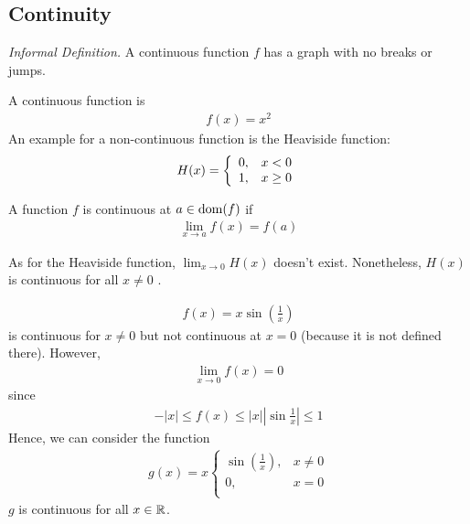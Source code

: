 






\subsection{Continuity}
\emph{Informal Definition.} A continuous function $f$ has a graph with no breaks or jumps.
\begin{ex} A continuous function is
\begin{align*}
f(x) = x^2
\end{align*}
An example for a non-continuous function is the Heaviside function:
\begin{align*}
H(x) = \left\{
\begin{array}{l l}
0, & x<0\\
1, & x\ge 0
\end{array}\right.
\end{align*} 
\end{ex}
\begin{df}
A function $f$ is continuous at $a \in \operatorname{dom}(f)$ if 
\begin{align*}
\lim_{x\to a} f(x) = f(a)
\end{align*}
\end{df}
As for the Heaviside function, $\lim_{x\to 0} H(x)$ doesn't exist. Nonetheless, $H(x)$ is continuous for all $x \neq 0$ .

\begin{ex}
\begin{align*}
f(x) = x \sin \left( \frac 1 x \right)
\end{align*}
is continuous for $x \neq 0$ but not continuous at $x=0$ (because it is not defined there). However,
\begin{align*}
\lim_{x\to 0} f(x) = 0
\end{align*}
since 
\begin{align*}
-|x| \leq f(x) \leq |x|
\left| \sin \frac  1 x \right| \leq 1
\end{align*}
Hence, we can consider the function
\begin{align*}
g(x) = x  \left\{ \begin{array}{ll}
\sin \left( \frac 1 x \right), & x \neq 0 \\
 0, & x=0 \\
\end{array} \right.
\end{align*} 
$g$ is continuous for all $x \in \mathbb R$.
\end{ex}

